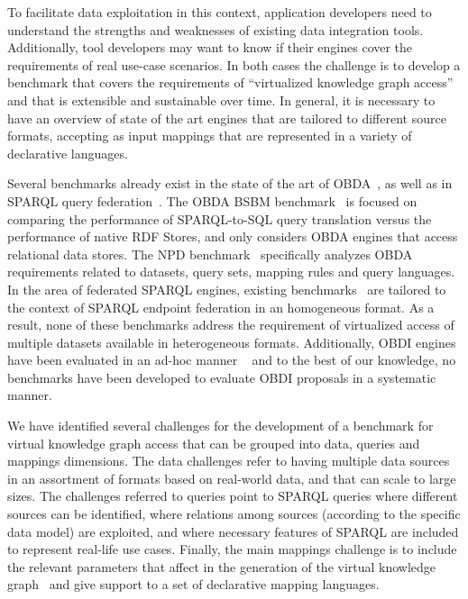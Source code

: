 To facilitate data exploitation in this context, application developers need to understand the strengths and weaknesses of existing data integration tools. Additionally, tool developers may want to know if their engines cover the requirements of real use-case scenarios. In both cases the challenge is to develop a benchmark that covers the requirements of ``virtualized knowledge graph access''  and that is extensible and sustainable over time. In general, it is  necessary to have an overview of state of the art engines that are tailored to different source formats, accepting as input mappings that are represented in a variety of declarative languages.

Several benchmarks already exist in the state of the art of OBDA~\citep{bizer2009berlin,lanti2015npd}, as well as in SPARQL query federation~\citep{schmidt2011fedbench,hasnain2017biofed,montoya2012benchmarking}. The OBDA BSBM benchmark~\citep{bizer2009berlin} is focused on comparing the performance of SPARQL-to-SQL query translation versus the performance of native RDF Stores, and only considers OBDA engines that access relational data stores. The NPD benchmark~\citep{lanti2015npd} specifically analyzes OBDA requirements related to datasets, query sets, mapping rules and query languages. In the area of federated SPARQL engines, existing benchmarks~\citep{schmidt2011fedbench,hasnain2017biofed,montoya2012benchmarking} are tailored to the context of SPARQL endpoint federation in an homogeneous format. As a result, none of these benchmarks address the requirement of virtualized access of multiple datasets available in heterogeneous formats. Additionally, OBDI engines have been evaluated in an ad-hoc manner ~\citep{endris2019ontario,mami2019querying} and to the best of our knowledge, no benchmarks have been developed to evaluate OBDI proposals in a systematic manner. 

We have identified several challenges for the development of a benchmark for virtual knowledge graph access that can be grouped into data, queries and mappings dimensions. The data challenges refer to having multiple data sources in an assortment of formats based on real-world data, and that can scale to large sizes. The challenges referred to queries point to SPARQL queries where different sources can be identified, where relations among sources (according to the specific data model) are exploited, and where necessary features of SPARQL are included to represent real-life use cases. Finally, the main mappings challenge is to include the relevant parameters that affect in the generation of the virtual knowledge graph~\citep{chaves2019what} and give support to a set of declarative mapping languages.

